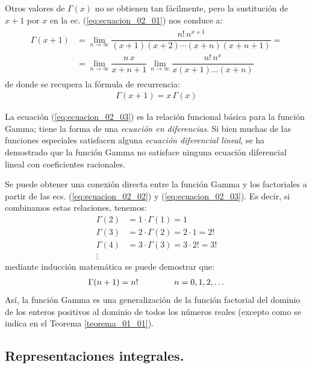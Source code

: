 Otros valores de $\Gamma (x)$ no se obtienen tan fácilmente, pero la sustitución de $x + 1$ por $x$ en la ec. (\ref{eq:ecuacion_02_01}) nos conduce a:
\begin{align*}
\begin{aligned}
\Gamma (x + 1) &= \lim_{n \to \infty} \dfrac{n! \, n^{x+1}}{(x + 1)(x + 2) \cdots (x + n)(x + n + 1)} = \\[0.5em]
&= \lim_{n \to \infty} \dfrac{n \, x}{x + n + 1} \, \lim_{n \to \infty} \dfrac{n! \, n^{x}}{x (x + 1) \ldots (x + n)}
\end{aligned}
\end{align*}
de donde se recupera la fórmula de recurrencia:
\begin{align}
\Gamma (x + 1) =  x \, \Gamma (x)
\label{eq:ecuacion_02_03}
\end{align}

La ecuación (\ref{eq:ecuacion_02_03}) es la relación funcional básica para la función Gamma; tiene la forma de una \emph{ecuación en diferencias}. Si bien muchas de las funciones especiales satisfacen alguna \emph{ecuación diferencial lineal}, se ha demostrado que la función Gamma no satisface ninguna ecuación diferencial lineal con coeficientes racionales.
\par
Se puede obtener una conexión directa entre la función Gamma y los factoriales a partir de las ecs. (\ref{eq:ecuacion_02_02}) y (\ref{eq:ecuacion_02_03}). Es decir, si combinamos estas relaciones, tenemos:
\begin{align*}
\Gamma (2) &= 1 \cdot \Gamma(1) = 1 \\[0.5em]
\Gamma (3) &= 2 \cdot \Gamma(2) = 2 \cdot 1 = 2! \\[0.5em]
\Gamma (4) &= 3 \cdot \Gamma(3) = 3 \cdot 2! = 3! \\[0.5em]
\vdots
\end{align*}
mediante inducción matemática se puede demostrar que:
\begin{align}
\Gamma (n + 1) = n! \hspace{1.5cm} n = 0, 1, 2, \ldots
\label{eq:ecuacion_02_04}
\end{align}
Así, la función Gamma es una generalización de la función factorial del dominio de los enteros positivos al dominio de todos los números reales (excepto como se indica en el Teorema \ref{teorema_01_01}).

\subsection{Representaciones integrales.}


